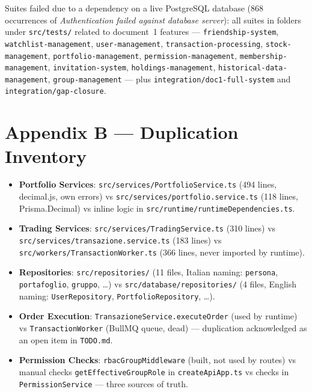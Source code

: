 \documentclass[11pt,a4paper]{article}
\newcommand{\file}[1]{\texttt{\small #1}}
\begin{document}
	\begin{sloppypar}
		Suites failed due to a dependency on a live PostgreSQL database (868 occurrences of \emph{Authentication failed against database server}): all suites in folders under \file{src/tests/} related to document~1 features --- \file{friendship-system}, \file{watchlist-management}, \file{user-management}, \file{transaction-processing}, \file{stock-management}, \file{portfolio-management}, \file{permission-management}, \file{membership-management}, \file{invitation-system}, \file{holdings-management}, \file{historical-data-management}, \file{group-management} --- plus \file{integration/doc1-full-system} and \file{integration/gap-closure}.
	\end{sloppypar}
	
	\section{Appendix B --- Duplication Inventory}
	
	\begin{itemize}[leftmargin=1.5em,itemsep=2pt]
		\sloppy
		\item \textbf{Portfolio Services}: \file{src/services/PortfolioService.ts} (494 lines, decimal.js, own errors) vs \file{src/services/portfolio.service.ts} (118 lines, Prisma.Decimal) vs inline logic in \file{src/runtime/runtimeDependencies.ts}.
		\item \textbf{Trading Services}: \file{src/services/TradingService.ts} (310 lines) vs \file{src/services/transazione.service.ts} (183 lines) vs \file{src/workers/TransactionWorker.ts} (366 lines, never imported by runtime).
		\item \textbf{Repositories}: \file{src/repositories/} (11 files, Italian naming: \file{persona}, \file{portafoglio}, \file{gruppo}, \dots) vs \file{src/database/repositories/} (4 files, English naming: \file{UserRepository}, \file{PortfolioRepository}, \dots).
		\item \textbf{Order Execution}: \file{TransazioneService.executeOrder} (used by runtime) vs \file{TransactionWorker} (BullMQ queue, dead) --- duplication acknowledged as an open item in \file{TODO.md}.
		\item \textbf{Permission Checks}: \file{rbacGroupMiddleware} (built, not used by routes) vs manual checks \file{getEffectiveGroupRole} in \file{createApiApp.ts} vs checks in \file{PermissionService} --- three sources of truth.
	\end{itemize}
	\newpage
\end{document}
